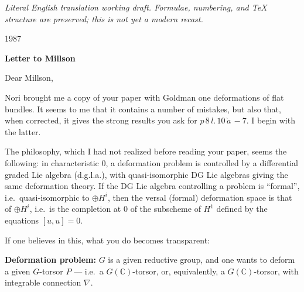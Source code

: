 \documentclass[11pt,a4paper]{article}
\begin{document}
\begin{center}\small\emph{Literal English translation working draft. Formulae, numbering, and TeX structure are preserved; this is not yet a modern recast.}\end{center}
\vspace{0.5em}


\begin{flushright}
1987
\end{flushright}

\vspace{1cm}

\begin{center}
\Large\textbf{Letter to Millson}
\end{center}

\vspace{0.5cm}

\noindent Dear Millson,

\vspace{0.5cm}

Nori brought me a copy of your paper with Goldman one deformations of flat bundles. It seems to me that it contains a number of mistakes, but also that, when corrected, it gives the strong results you ask for $p\,8\,l.\,10\,\grave{a}\,-7$. I begin with the latter.

\vspace{0.3cm}

The philosophy, which I had not realized before reading your paper, seems the following: in characteristic $0$, a deformation problem is controlled by a differential graded Lie algebra (d.g.l.a.), with quasi-isomorphic DG Lie algebras giving the same deformation theory. If the DG Lie algebra controlling a problem is ``formal'', i.e.\ quasi-isomorphic to $\oplus H^i$, then the versal (formal) deformation space is that of $\oplus H^i$, i.e.\ is the completion at $0$ of the subscheme of $H^1$ defined by the equations $[u,u]=0$.

\vspace{0.3cm}

If one believes in this, what you do becomes transparent:

\vspace{0.2cm}

\noindent\textbf{Deformation problem:} $G$ is a given reductive group, and one wants to deform a given $G$-torsor $P$ --- i.e.\ a $G(\mathbb{C})$-torsor, or, equivalently, a $G(\mathbb{C})$-torsor, with integrable connection $\nabla$.

\vspace{0.2cm}
\end{document}

